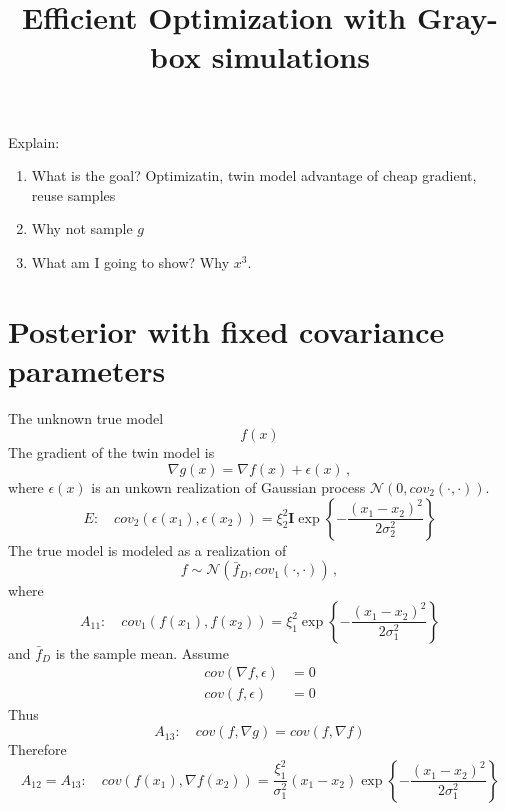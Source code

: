 \documentclass[a4paper,onecolumn]{article}
\theoremstyle{remark}
\begin{document}
\setcounter{page}{1}

\title{Efficient Optimization with Gray-box simulations}
\maketitle
Explain:
\begin{enumerate}
    \item What is the goal? Optimizatin, twin model advantage of cheap gradient, reuse samples
    \item Why not sample $g$
    \item What am I going to show? Why $x^3$.
\end{enumerate}
\section{Posterior with fixed covariance parameters}
\noindent The unknown true model
$$
    f(x)
$$
The gradient of the twin model is
\begin{equation}
    \nabla g(x) = \nabla f(x) + \epsilon(x)\,,
\end{equation}
where $\epsilon(x)$ is an unkown realization of Gaussian process
$\mathcal{N}(0, cov_2(\cdot,\cdot))$.
\begin{equation}
    E: \quad cov_2(\epsilon(x_1), \epsilon(x_2)) = \xi_2^2 \boldsymbol{I}\exp\left\{-\frac{(x_1-x_2)^2}{2\sigma_2^2}\right\}
\end{equation}
The true model is modeled as a realization of
\begin{equation}
    f\sim \mathcal{N}\left(\bar{f}_D, cov_1(\cdot,\cdot)\right)\,,
\end{equation}
where
\begin{equation}
    A_{11}: \quad cov_1(f(x_1), f(x_2)) = \xi_1^2 \exp\left\{ -\frac{(x_1-x_2)^2}{2\sigma_1^2} \right\}
\end{equation}
and
$\bar{f}_D$ is the sample mean.
Assume
\begin{equation}\begin{split}
    cov(\nabla f, \epsilon) &= 0\\
    cov(f, \epsilon) &= 0
\end{split}\end{equation}
Thus
\begin{equation}
    A_{13}: \quad cov(f, \nabla g) = cov(f, \nabla f)
\end{equation}
\noindent Therefore
\begin{equation}
    A_{12} = A_{13}: \quad cov(f(x_1), \nabla f(x_2)) = \frac{\xi_1^2}{\sigma_1^2} (x_1-x_2) \exp\left\{
    -\frac{(x_1-x_2)^2}{2\sigma_1^2}
    \right\}
\end{equation}
\end{document}
